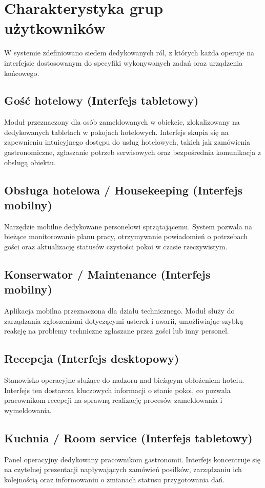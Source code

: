 \section{Charakterystyka grup użytkowników}
W systemie zdefiniowano siedem dedykowanych ról, z których każda operuje na interfejsie dostosowanym do specyfiki wykonywanych zadań oraz urządzenia końcowego.

\subsection{Gość hotelowy (Interfejs tabletowy)}
Moduł przeznaczony dla osób zameldowanych w obiekcie, zlokalizowany na dedykowanych tabletach w pokojach hotelowych. Interfejs skupia się na zapewnieniu intuicyjnego dostępu do usług hotelowych, takich jak zamówienia gastronomiczne, zgłaszanie potrzeb serwisowych oraz bezpośrednia komunikacja z obsługą obiektu.

\subsection{ Obsługa hotelowa / Housekeeping (Interfejs mobilny)}
Narzędzie mobilne dedykowane personelowi sprzątającemu. System pozwala na bieżące monitorowanie planu pracy, otrzymywanie powiadomień o potrzebach gości oraz aktualizację statusów czystości pokoi w czasie rzeczywistym.

\subsection{Konserwator / Maintenance (Interfejs mobilny)}
Aplikacja mobilna przeznaczona dla działu technicznego. Moduł służy do zarządzania zgłoszeniami dotyczącymi usterek i awarii, umożliwiając szybką reakcję na problemy techniczne zgłaszane przez gości lub inny personel.

\subsection{Recepcja (Interfejs desktopowy)}
Stanowisko operacyjne służące do nadzoru nad bieżącym obłożeniem hotelu. Interfejs ten dostarcza kluczowych informacji o stanie pokoi, co pozwala pracownikom recepcji na sprawną realizację procesów zameldowania i wymeldowania.

\subsection{Kuchnia / Room service (Interfejs tabletowy)}
Panel operacyjny dedykowany pracownikom gastronomii. Interfejs koncentruje się na czytelnej prezentacji napływających zamówień posiłków, zarządzaniu ich kolejnością oraz informowaniu o zmianach statusu przygotowania dań.

